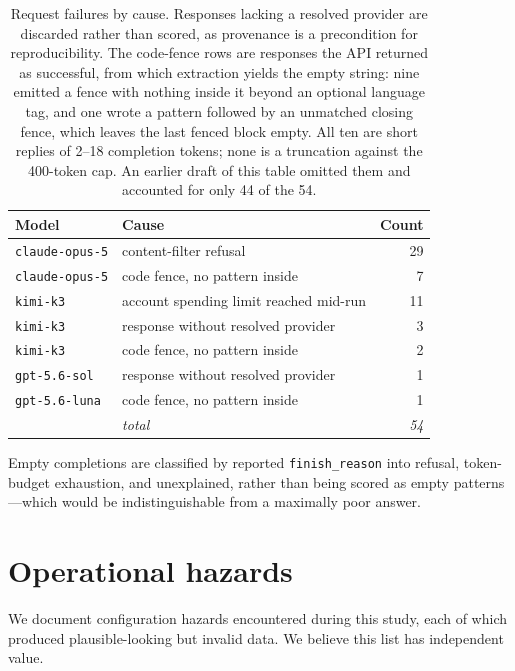\documentclass[11pt]{article}
\begin{document}
\begin{table}[htbp]
\centering
\small
\begin{tabular}{llr}
\toprule
Model & Cause & Count \\
\midrule
\texttt{claude-opus-5} & content-filter refusal & 29 \\
\texttt{claude-opus-5} & code fence, no pattern inside & 7 \\
\texttt{kimi-k3} & account spending limit reached mid-run & 11 \\
\texttt{kimi-k3} & response without resolved provider & 3 \\
\texttt{kimi-k3} & code fence, no pattern inside & 2 \\
\texttt{gpt-5.6-sol} & response without resolved provider & 1 \\
\texttt{gpt-5.6-luna} & code fence, no pattern inside & 1 \\
\midrule
& \textit{total} & \textit{54} \\
\bottomrule
\end{tabular}
\caption{Request failures by cause. Responses lacking a resolved provider are
discarded rather than scored, as provenance is a precondition for
reproducibility. The code-fence rows are responses the API returned as
successful, from which extraction yields the empty string: nine emitted a
fence with nothing inside it beyond an optional language tag, and one wrote a
pattern followed by an unmatched closing fence, which leaves the last fenced
block empty. All ten are short replies of 2--18 completion tokens; none is a
truncation against the 400-token cap. An earlier draft of this table omitted
them and accounted for only 44 of the 54.}
\end{table}

Empty completions are classified by reported \texttt{finish\_reason} into
refusal, token-budget exhaustion, and unexplained, rather than being scored
as empty patterns---which would be indistinguishable from a maximally poor
answer.

\section{Operational hazards}
\label{app:hazards}

We document configuration hazards encountered during this study, each of
which produced plausible-looking but invalid data. We believe this list has
independent value.
\end{document}
